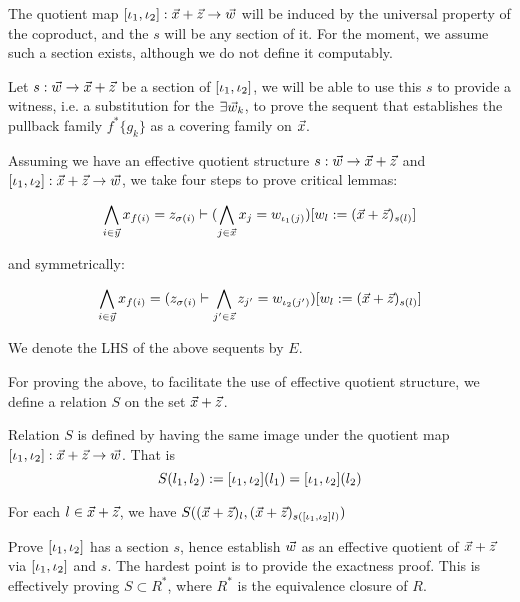 The quotient map $[\iota_1,\iota_2]: \vec{x}+ \vec{z}\to \vec{w}$ will be induced by the
universal property of the coproduct, and the $s$ will be any section of it. For the moment, we assume such a section exists, although we do not define it 
computably.

Let $s:\vec{w}\to \vec{x}+\vec{z}$ be a section of $[\iota_1,\iota_2]$, we will be able to use this $s$ to provide a witness, i.e. a substitution for the $\exists \vec{w}_k$, to prove the
sequent that establishes the pullback family $f^*\{g_k\}$ as a covering family on $\vec{x}$.


Assuming we have an effective quotient structure $s:\vec{w}\to \vec{x}+\vec{z}$ and $[\iota_1,\iota_2]:\vec{x}+\vec{z}\to \vec{w}$, we take four steps to prove critical lemmas:

  \begin{equation*}
    \bigwedge_{i\in \vec{y}} x_{f(i)} = z_{\sigma(i)} \vdash 
     (\bigwedge_{j\in\vec{x}}x_j = w_{\iota_1(j)}) [w_l:=(\vec{x}+\vec{z})_{s(l)}] 
   \end{equation*}

and symmetrically:

\begin{equation*}
  \bigwedge_{i\in \vec{y}} x_{f(i)} = (z_{\sigma(i)} \vdash \bigwedge_{j'\in\vec{z}}z_{j'}= w_{\iota_2(j')}) [w_l:=(\vec{x}+\vec{z})_{s(l)}]
\end{equation*}

We denote the LHS of the above sequents by $E$.

For proving the above, to facilitate the use of effective quotient structure, we define a relation $S$ on the set $\vec{x}+\vec{z}$.
\begin{definition}
  Relation $S$ is defined by having the same image under the quotient map $[\iota_1,\iota_2]:\vec{x}+\vec{z}\to \vec{w}$. That is 
  \begin{equation}
    S(l_1,l_2):= [\iota_1,\iota_2](l_1) = [\iota_1,\iota_2](l_2)
  \end{equation}
\end{definition}



\begin{lemma}\label{Lem:CovWit1}
  For each $l\in \vec{x}+\vec{z}$, we have $S((\vec{x}+\vec{z})_l, (\vec{x}+\vec{z})_{s([\iota_1,\iota_2] l)})$
\end{lemma}

\begin{lemma}\label{Lem:CovWit2}
  Prove $[\iota_1,\iota_2]$ has a section $s$, hence establish $\vec{w}$ as an effective quotient of $\vec{x} +\vec{z}$ via $[\iota_1,\iota_2]$ and $s$.
  The hardest point is to provide the exactness proof.
  This is effectively proving $S\subset R^*$, where $R^*$ is the equivalence closure of $R$.
\end{lemma}


